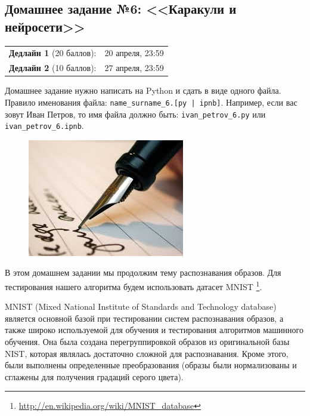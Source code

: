 \documentclass[a4paper,12pt]{article}
\begin{document}
\subsection*{Домашнее задание №6: <<Каракули и нейросети>>}

\begin{tabular}{@{}lr}
  \textbf{Дедлайн 1} (20 баллов): & 20 апреля, 23:59 \\
  \textbf{Дедлайн 2} (10 баллов): & 27 апреля, 23:59
\end{tabular}

Домашнее задание нужно написать на Python и сдать в виде одного файла.
Правило именования файла: \texttt{name\_surname\_6.[py | ipnb]}. Например, если
вас зовут Иван Петров, то имя файла должно быть: \texttt{ivan\_petrov\_6.py} или \texttt{ivan\_petrov\_6.ipnb}.

\makebox[\linewidth]{\hrulefill}

\begin{figure}[h!]
  \centering
  \includegraphics[width=.7\linewidth]{images/images}
\end{figure}


В этом домашнем задании мы продолжим тему распознавания образов. Для тестирования нашего алгоритма будем использовать датасет MNIST \footnote{\url{http://en.wikipedia.org/wiki/MNIST_database}}. 

MNIST (Mixed National Institute of Standards and Technology database) является основной базой при тестировании систем распознавания образов, а также широко используемой для обучения и тестирования алгоритмов машинного обучения. Она была создана перегруппировкой образов из оригинальной базы NIST, которая являлась достаточно сложной для распознавания. Кроме этого, были выполнены определенные преобразования (образы были нормализованы и сглажены для получения градаций серого цвета). 
\end{document}
